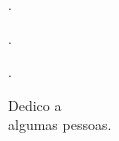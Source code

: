 \documentclass[
	11pt,				%
	openright,			%
	oneside,			%
	a4paper,			%
	english,			%
	french,				%
	spanish,			%
	brazil,				%
	]{abntex2}
\begin{document}






%



.

.

.



%

\begin{dedicatoria}
    \vspace*{\fill}
	\begin{flushright}
		Dedico a\\
		algumas pessoas.
	\end{flushright}
\end{dedicatoria}
\end{document}
